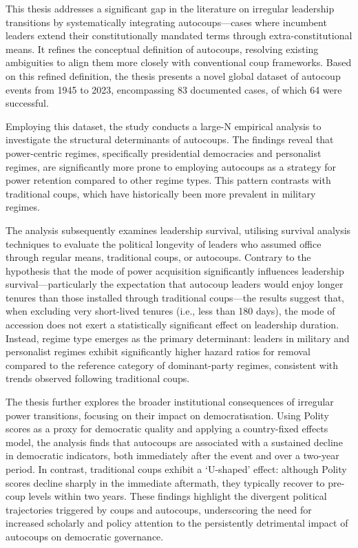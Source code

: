 \documentclass[
  12pt,
]{report}
\begin{document}
This thesis addresses a significant gap in the literature on irregular
leadership transitions by systematically integrating autocoups---cases
where incumbent leaders extend their constitutionally mandated terms
through extra-constitutional means. It refines the conceptual definition
of autocoups, resolving existing ambiguities to align them more closely
with conventional coup frameworks. Based on this refined definition, the
thesis presents a novel global dataset of autocoup events from 1945 to
2023, encompassing 83 documented cases, of which 64 were successful.

Employing this dataset, the study conducts a large-N empirical analysis
to investigate the structural determinants of autocoups. The findings
reveal that power-centric regimes, specifically presidential democracies
and personalist regimes, are significantly more prone to employing
autocoups as a strategy for power retention compared to other regime
types. This pattern contrasts with traditional coups, which have
historically been more prevalent in military regimes.

The analysis subsequently examines leadership survival, utilising
survival analysis techniques to evaluate the political longevity of
leaders who assumed office through regular means, traditional coups, or
autocoups. Contrary to the hypothesis that the mode of power acquisition
significantly influences leadership survival---particularly the
expectation that autocoup leaders would enjoy longer tenures than those
installed through traditional coups---the results suggest that, when
excluding very short-lived tenures (i.e., less than 180 days), the mode
of accession does not exert a statistically significant effect on
leadership duration. Instead, regime type emerges as the primary
determinant: leaders in military and personalist regimes exhibit
significantly higher hazard ratios for removal compared to the reference
category of dominant-party regimes, consistent with trends observed
following traditional coups.

The thesis further explores the broader institutional consequences of
irregular power transitions, focusing on their impact on
democratisation. Using Polity scores as a proxy for democratic quality
and applying a country-fixed effects model, the analysis finds that
autocoups are associated with a sustained decline in democratic
indicators, both immediately after the event and over a two-year period.
In contrast, traditional coups exhibit a `U-shaped' effect: although
Polity scores decline sharply in the immediate aftermath, they typically
recover to pre-coup levels within two years. These findings highlight
the divergent political trajectories triggered by coups and autocoups,
underscoring the need for increased scholarly and policy attention to
the persistently detrimental impact of autocoups on democratic
governance.
\end{document}
